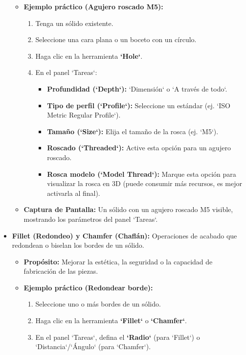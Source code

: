 \documentclass[12pt]{article}
\begin{document}
\begin{itemize}[label=\textbullet]
\begin{itemize}[label=\textendash]
        \item \textbf{Ejemplo práctico (Agujero roscado M5):}
        \begin{enumerate}[label=\arabic*)]
            \item Tenga un sólido existente.
            \item Seleccione una cara plana o un boceto con un círculo.
            \item Haga clic en la herramienta \textbf{`Hole`}.
            \item En el panel `Tareas`:
            \begin{itemize}[label=\textendash]
                \item \textbf{Profundidad (`Depth`):} `Dimensión` o `A través de todo`.
                \item \textbf{Tipo de perfil (`Profile`):} Seleccione un estándar (ej. `ISO Metric Regular Profile`).
                \item \textbf{Tamaño (`Size`):} Elija el tamaño de la rosca (ej. `M5`).
                \item \textbf{Roscado (`Threaded`):} Active esta opción para un agujero roscado.
                \item \textbf{Rosca modelo (`Model Thread`):} Marque esta opción para visualizar la rosca en 3D (puede consumir más recursos, es mejor activarla al final).
            \end{itemize}
        \end{enumerate}
        \item \textbf{Captura de Pantalla:} Un sólido con un agujero roscado M5 visible, mostrando los parámetros del panel `Tareas`.
    \end{itemize}
    \item \textbf{Fillet (Redondeo) y Chamfer (Chaflán):} Operaciones de acabado que redondean o biselan los bordes de un sólido.
    \begin{itemize}[label=\textendash]
        \item \textbf{Propósito:} Mejorar la estética, la seguridad o la capacidad de fabricación de las piezas.
        \item \textbf{Ejemplo práctico (Redondear borde):}
        \begin{enumerate}[label=\arabic*)]
            \item Seleccione uno o más bordes de un sólido.
            \item Haga clic en la herramienta \textbf{`Fillet`} o \textbf{`Chamfer`}.
            \item En el panel `Tareas`, defina el \textbf{`Radio`} (para `Fillet`) o `Distancia`/`Ángulo` (para `Chamfer`).

\end{enumerate}
\end{itemize}
\end{itemize}
\end{document}
